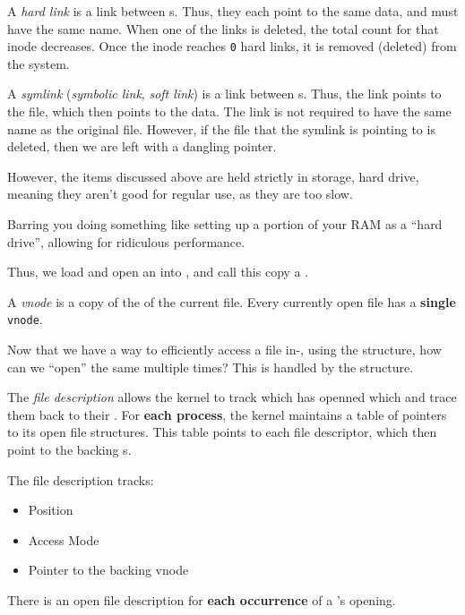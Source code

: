 \begin{definition}\label{def:Hard_Link}
  A \emph{hard link} is a link between s.
  Thus, they each point to the same data, and must have the same name.
  When one of the links is deleted, the total count for that inode decreases.
  Once the inode reaches \texttt{0} hard links, it is removed (deleted) from the system.
\end{definition}

\begin{definition}[Symlink]\label{def:Symlink}\label{def:Symbolic_Link}\label{def:Soft_Link}
  A \emph{symlink} (\emph{symbolic link}, \emph{soft link}) is a link between s.
  Thus, the link points to the file, which then points to the data.
  The link is not required to have the same name as the original file.
  However, if the file that the symlink is pointing to is deleted, then we are left with a dangling pointer.
\end{definition}

However, the items discussed above are held strictly in storage, hard drive, meaning they aren't good for regular use, as they are too slow.
\begin{remark*}
  Barring you doing something like setting up a portion of your RAM as a ``hard drive'', allowing for ridiculous performance.
\end{remark*}

Thus, we load and open an  into , and call this copy a .

\begin{definition}\label{def:vnode}
  A \emph{vnode} is a copy of the  of the current file.
  Every currently open file has a \textbf{single} \texttt{vnode}.
\end{definition}

Now that we have a way to efficiently access a file in-, using the  structure, how can we ``open'' the same  multiple times?
This is handled by the  structure.

\begin{definition}\label{def:File_Description}
  The \emph{file description} allows the kernel to track which  has openned which  and trace them back to their .
  For \textbf{each process}, the kernel maintains a table of pointers to its open file structures.
  This table points to each file descriptor, which then point to the backing s.

  The file description tracks:
  \begin{itemize}[noitemsep]
  \item Position
  \item Access Mode
  \item Pointer to the backing vnode
  \end{itemize}

  There is an open file description for \textbf{each occurrence} of a 's opening.
\end{definition}


